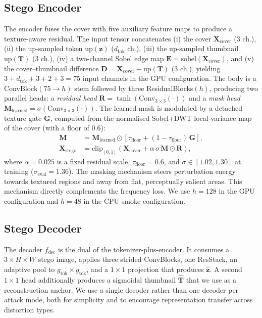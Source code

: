 \documentclass[conference]{IEEEtran}
\begin{document}
\subsection{Stego Encoder}
\label{sec:enc}
The encoder fuses the cover with five auxiliary feature maps to produce a texture-aware residual. The input tensor concatenates (i) the cover $\mathbf{X}_{\text{cover}}$ ($3$ ch.), (ii) the up-sampled token $\mathrm{up}(\mathbf{z})$ ($d_{\text{tok}}$ ch.), (iii) the up-sampled thumbnail $\mathrm{up}(\mathbf{T})$ ($3$ ch.), (iv) a two-channel Sobel edge map $\mathbf{E}=\mathrm{sobel}(\mathbf{X}_{\text{cover}})$, and (v) the cover--thumbnail difference $\mathbf{D}=\mathbf{X}_{\text{cover}}-\mathrm{up}(\mathbf{T})$ ($3$ ch.), yielding $3{+}d_{\text{tok}}{+}3{+}2{+}3=75$ input channels in the GPU configuration. The body is a ConvBlock$(75\!\to\!h)$ stem followed by three ResidualBlocks$(h)$, producing two parallel heads: a \emph{residual head} $\mathbf{R}=\tanh(\text{Conv}_{3\times3}(\cdot))$ and a \emph{mask head} $\mathbf{M}_{\text{learned}}=\sigma(\text{Conv}_{3\times3}(\cdot))$. The learned mask is modulated by a detached texture gate $\mathbf{G}$, computed from the normalised Sobel+DWT local-variance map of the cover (with a floor of $0.6$):
\begin{align}
    \mathbf{M} &= \mathbf{M}_{\text{learned}} \odot \left[\tau_{\text{floor}} + (1-\tau_{\text{floor}})\,\mathbf{G}\right], \label{eq:mask}\\
    \mathbf{X}_{\text{stego}} &= \mathrm{clip}_{[0,1]}\!\left(\mathbf{X}_{\text{cover}}+\alpha\,\sigma\,\mathbf{M}\odot\mathbf{R}\right),
    \label{eq:stego}
\end{align}
where $\alpha\!=\!0.025$ is a fixed residual scale, $\tau_{\text{floor}}\!=\!0.6$, and $\sigma\!\in\![1.02,1.30]$ at training ($\sigma_{\text{eval}}\!=\!1.36$). The masking mechanism steers perturbation energy towards textured regions and away from flat, perceptually salient areas. This mechanism directly complements the frequency loss. We use $h\!=\!128$ in the GPU configuration and $h\!=\!48$ in the CPU smoke configuration.

\subsection{Stego Decoder}
\label{sec:dec}
The decoder $f_{\text{dec}}$ is the dual of the tokenizer-plus-encoder. It consumes a $3\!\times\!H\!\times\!W$ stego image, applies three strided ConvBlocks, one ResStack, an adaptive pool to $g_{\text{tok}}\!\times\!g_{\text{tok}}$, and a $1\!\times\!1$ projection that produces $\hat{\mathbf{z}}$. A second $1\!\times\!1$ head additionally produces a sigmoidal thumbnail $\hat{\mathbf{T}}$ that we use as a reconstruction anchor. We use a single decoder rather than one decoder per attack mode, both for simplicity and to encourage representation transfer across distortion types.
\end{document}
